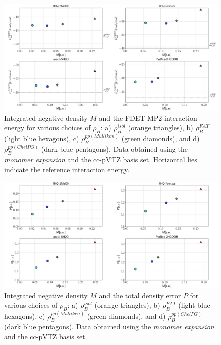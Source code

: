 \documentclass[amsmath,amssymb,preprint,aip,jcp]{revtex4-1}
\begin{document}
\begin{figure}
\centering
\includegraphics[width=1.0\linewidth]{M_vs_MP_ccpVTZ.pdf}
\caption{Integrated negative density $M$ and the FDET-MP2 interaction energy for various choices of $\rho_B$: a) $\rho_B^{isol}$ (orange triangles), b) $\rho_B^{FAT}$ (light blue hexagons), c) $\rho_B^{pp(Mulliken)}$ (green diamonds), and d) $\rho_B^{pp(ChelPG)}$ (dark blue pentagons). Data obtained using the {\it monomer expansion} and the cc-pVTZ basis set. Horizontal lies indicate the reference interaction energy.}
\label{fig:M_vs_MP_ccpVTZ}
\end{figure}

\begin{figure}
\centering
\includegraphics[width=1.0\linewidth]{M_vs_P_ccpVTZ.pdf}
\caption{Integrated negative density $M$ and the total density error $P$ for various choices of $\rho_B$: a) $\rho_B^{isol}$ (orange triangles), b) $\rho_B^{FAT}$ (light blue hexagons), c) $\rho_B^{pp(Mulliken)}$ (green diamonds), and d) $\rho_B^{pp(ChelPG)}$ (dark blue pentagons). Data obtained using the {\it monomer expansion} and the cc-pVTZ basis set.}
\label{fig:M_vs_P_ccpVTZ}
\end{figure}
\end{document}
